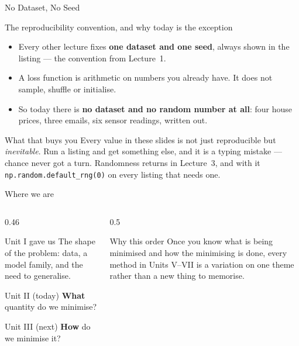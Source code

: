 \documentclass[aspectratio=169]{beamer}
\begin{document}
\begin{frame}[shrink=6]{No Dataset, No Seed}
  \begin{block}{The reproducibility convention, and why today is the exception}
    \small
    \begin{itemize}
      \item Every other lecture fixes \textbf{one dataset and one seed}, always
        shown in the listing --- the convention from Lecture~1.
      \item A loss function is arithmetic on numbers you already have. It does
        not sample, shuffle or initialise.
      \item So today there is \textbf{no dataset and no random number at all}:
        four house prices, three emails, six sensor readings, written out.
    \end{itemize}
  \end{block}
  \begin{alertblock}{What that buys you}
    \small Every value in these slides is not just reproducible but
    \emph{inevitable}. Run a listing and get something else, and it is a typing
    mistake --- chance never got a turn. Randomness returns in Lecture~3, and
    with it \texttt{np.random.default\_rng(0)} on every listing that needs one.
  \end{alertblock}
\end{frame}

\begin{frame}{Where we are}
  \begin{columns}[T]
    \begin{column}{0.46\textwidth}
      \begin{block}{Unit I gave us}
        The shape of the problem: data, a model family, and the need to
        generalise.
      \end{block}
      \begin{exampleblock}{Unit II (today)}
        \textbf{What} quantity do we minimise?
      \end{exampleblock}
      \begin{block}{Unit III (next)}
        \textbf{How} do we minimise it?
      \end{block}
    \end{column}
    \begin{column}{0.5\textwidth}
      \begin{alertblock}{Why this order}
        Once you know what is being minimised and how the minimising is done,
        every method in Units V--VII is a variation on one theme rather than a
        new thing to memorise.
      \end{alertblock}
    \end{column}
  \end{columns}
\end{frame}
\end{document}
